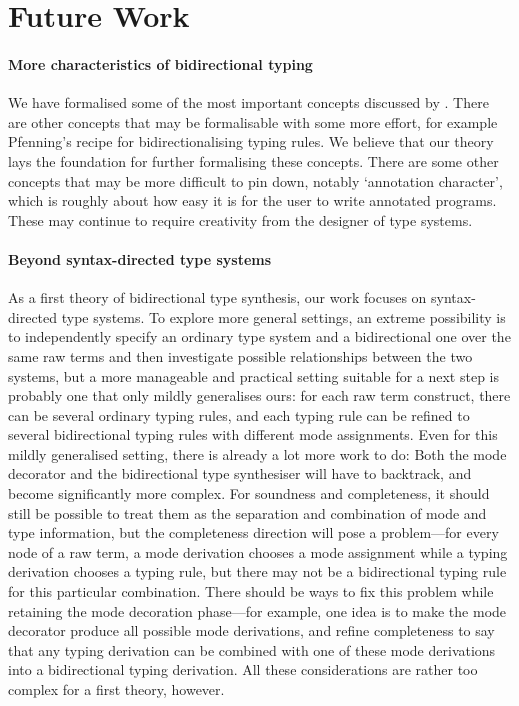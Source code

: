 
\section{Future Work} \label{sec:future}

\paragraph{More characteristics of bidirectional typing}

We have formalised some of the most important concepts discussed by \citet{Dunfield2021}.
There are other concepts that may be formalisable with some more effort, for example Pfenning's recipe for bidirectionalising typing rules.
We believe that our theory lays the foundation for further formalising these concepts.
There are some other concepts that may be more difficult to pin down, notably `annotation character', which is roughly about how easy it is for the user to write annotated programs.
These may continue to require creativity from the designer of type systems.

\paragraph{Beyond syntax-directed type systems}

As a first theory of bidirectional type synthesis, our work focuses on syntax-directed type systems.
To explore more general settings, an extreme possibility is to independently specify an ordinary type system and a bidirectional one over the same raw terms and then investigate possible relationships between the two systems, but a more manageable and practical setting suitable for a next step is probably one that only mildly generalises ours: 
for each raw term construct, there can be several ordinary typing rules, and each typing rule can be refined to several bidirectional typing rules with different mode assignments.
Even for this mildly generalised setting, there is already a lot more work to do:
Both the mode decorator and the bidirectional type synthesiser will have to backtrack, and become significantly more complex.
For soundness and completeness, it should still be possible to treat them as the separation and combination of mode and type information, but the completeness direction will pose a problem---for every node of a raw term, a mode derivation chooses a mode assignment while a typing derivation chooses a typing rule, but there may not be a bidirectional typing rule for this particular combination.
There should be ways to fix this problem while retaining the mode decoration phase---for example, one idea is to make the mode decorator produce all possible mode derivations, and refine completeness to say that any typing derivation can be combined with one of these mode derivations into a bidirectional typing derivation.
All these considerations are rather too complex for a first theory, however.


